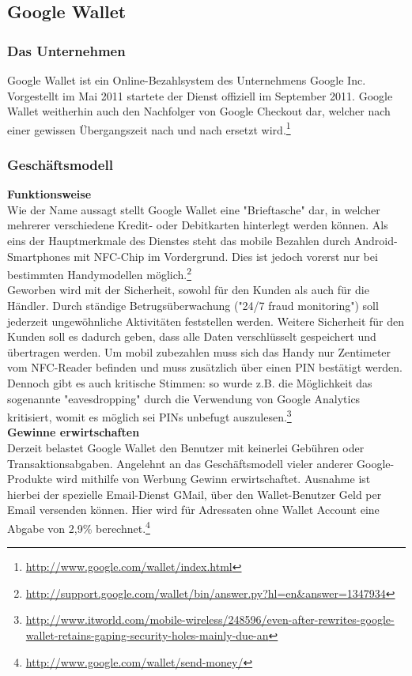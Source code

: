 \subsection{Google Wallet}
\subsubsection{Das Unternehmen}
Google Wallet ist ein Online-Bezahlsystem des Unternehmens Google Inc. Vorgestellt im Mai 2011 startete der Dienst offiziell im September 2011.
Google Wallet weitherhin auch den Nachfolger von Google Checkout dar, welcher nach einer gewissen Übergangszeit nach und nach ersetzt wird.\footnote{\url{http://www.google.com/wallet/index.html}}

\subsubsection{ Geschäftsmodell}
\textbf{Funktionsweise}\\
Wie der Name aussagt stellt Google Wallet eine "Brieftasche" dar, in welcher mehrerer verschiedene Kredit- oder Debitkarten hinterlegt werden können.
Als eins der Hauptmerkmale des Dienstes steht das mobile Bezahlen durch Android-Smartphones mit NFC-Chip im Vordergrund. Dies ist jedoch vorerst nur bei bestimmten Handymodellen möglich.\footnote{\url{http://support.google.com/wallet/bin/answer.py?hl=en\&answer=1347934}}\\
Geworben wird mit der Sicherheit, sowohl für den Kunden als auch für die Händler. Durch ständige Betrugsüberwachung ("24/7 fraud monitoring") soll jederzeit ungewöhnliche Aktivitäten feststellen werden. Weitere Sicherheit für den Kunden soll es dadurch geben, dass alle Daten verschlüsselt gespeichert und übertragen werden. Um mobil zubezahlen muss sich das Handy nur Zentimeter vom NFC-Reader befinden und muss zusätzlich über einen PIN bestätigt werden.\\
Dennoch gibt es auch kritische Stimmen: so wurde z.B. die Möglichkeit das sogenannte "eavesdropping" durch die Verwendung von Google Analytics kritisiert, womit es möglich sei PINs unbefugt auszulesen.\footnote{\url{http://www.itworld.com/mobile-wireless/248596/even-after-rewrites-google-wallet-retains-gaping-security-holes-mainly-due-an}}\\


\textbf{Gewinne erwirtschaften}\\
Derzeit belastet Google Wallet den Benutzer mit keinerlei Gebühren oder Transaktionsabgaben. Angelehnt an das Geschäftsmodell vieler anderer Google-Produkte wird mithilfe von Werbung Gewinn erwirtschaftet.
Ausnahme ist hierbei der spezielle Email-Dienst GMail, über den Wallet-Benutzer Geld per Email versenden können. Hier wird für Adressaten ohne Wallet Account eine Abgabe von 2,9\% berechnet.\footnote{\url{http://www.google.com/wallet/send-money/}}\\

